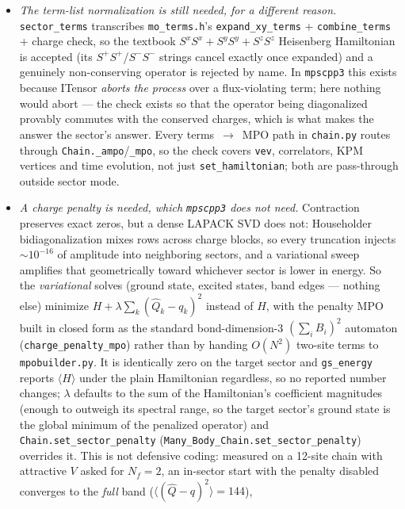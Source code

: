 \documentclass[11pt]{article}
\begin{document}
\begin{itemize}
  \item \emph{The term-list normalization is still needed, for a
    different reason.} \texttt{sector\_terms} transcribes
    \texttt{mo\_terms.h}'s \texttt{expand\_xy\_terms} +
    \texttt{combine\_terms} + charge check, so the textbook
    $S^xS^x+S^yS^y+S^zS^z$ Heisenberg Hamiltonian is accepted (its
    $S^+S^+$/$S^-S^-$ strings cancel exactly once expanded) and a
    genuinely non-conserving operator is rejected by name. In
    \texttt{mpscpp3} this exists because ITensor \emph{aborts the
    process} over a flux-violating term; here nothing would abort --- the
    check exists so that the operator being diagonalized provably
    commutes with the conserved charges, which is what makes the answer
    the sector's answer. Every terms~$\to$~MPO path in
    \texttt{chain.py} routes through
    \texttt{Chain.\_ampo}/\texttt{\_mpo}, so the check covers
    \texttt{vev}, correlators, KPM vertices and time evolution, not just
    \texttt{set\_hamiltonian}; both are pass-through outside sector mode.
  \item \emph{A charge penalty is needed, which \texttt{mpscpp3} does not
    need.} Contraction preserves exact zeros, but a dense LAPACK SVD does
    not: Householder bidiagonalization mixes rows across charge blocks,
    so every truncation injects ${\sim}10^{-16}$ of amplitude into
    neighboring sectors, and a variational sweep amplifies that
    geometrically toward whichever sector is lower in energy. So the
    \emph{variational} solves (ground state, excited states, band edges
    --- nothing else) minimize $H+\lambda\sum_k(\hat Q_k-q_k)^2$ instead
    of $H$, with the penalty MPO built in closed form as the standard
    bond-dimension-3 $(\sum_i B_i)^2$ automaton
    (\texttt{charge\_penalty\_mpo}) rather than by handing $O(N^2)$
    two-site terms to \texttt{mpobuilder.py}. It is identically zero on
    the target sector and \texttt{gs\_energy} reports $\langle H\rangle$
    under the plain Hamiltonian regardless, so no reported number
    changes; $\lambda$ defaults to the sum of the Hamiltonian's
    coefficient magnitudes (enough to outweigh its spectral range, so the
    target sector's ground state is the global minimum of the penalized
    operator) and \texttt{Chain.set\_sector\_penalty}
    (\texttt{Many\_Body\_Chain.set\_sector\_penalty}) overrides it. This
    is not defensive coding: measured on a 12-site chain with attractive
    $V$ asked for $N_f=2$, an in-sector start with the penalty disabled
    converges to the \emph{full} band ($\langle(\hat Q-q)^2\rangle=144$),

\end{itemize}
\end{document}

